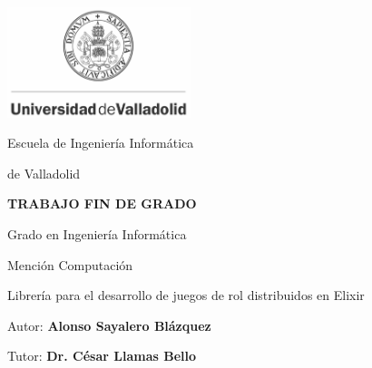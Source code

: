 \begin{titlepage}
\centering
\includegraphics[width=0.4\textwidth]{images/uva_logo.pdf}
\par
\vspace{2cm}
{\Huge Escuela de Ingeniería Informática}
\par
\vspace{0.2cm}
{\Huge de Valladolid}
\par
\vspace{0.5cm}
\textbf{\Large T\large RABAJO \Large F\large IN DE \Large G\large RADO}
\par
\vspace{2cm}
{\large Grado en Ingeniería Informática}
\par
\vspace{0.2cm}
{\large Mención Computación}
\par
\vfill
\begin{flushleft}
	{\Huge\strut Librería para el desarrollo de juegos de rol distribuidos en Elixir}
\end{flushleft}
\par
\vfill
\begin{flushright}
	{\Large Autor:}
	\linebreak
	\textbf{\Large Alonso Sayalero Blázquez}
	\linebreak
	\par
	{\Large Tutor:}
	\linebreak
	\textbf{\Large Dr. César Llamas Bello}
	\vspace{0.5cm}
\end{flushright}
\end{titlepage}